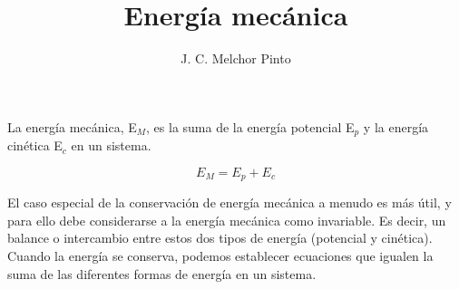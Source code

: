 \documentclass[12pt]{guia}
\title{Energía mecánica}
\author{J. C. Melchor Pinto}
\begin{document}
\pagestyle{headandfoot}
\addpoints
\INFO
\begin{opening}
    {La energía mecánica, E$_M$, es la suma de la energía potencial E$_p$ y
        la energía cinética E$_c$ en un sistema.

        \[ E_M=E_p+E_c\]

        El caso especial de la conservación de energía mecánica a menudo es más útil, y para ello debe considerarse a la energía mec\'anica como invariable. Es decir, un balance o intercambio entre estos dos tipos de energía (potencial y cinética). Cuando la energía se conserva, podemos establecer ecuaciones que igualen la suma de las diferentes formas de energía en un sistema.
    }
\end{opening}
\begin{questions}
    
    
    \newpage
    
\end{questions}

\end{document}
